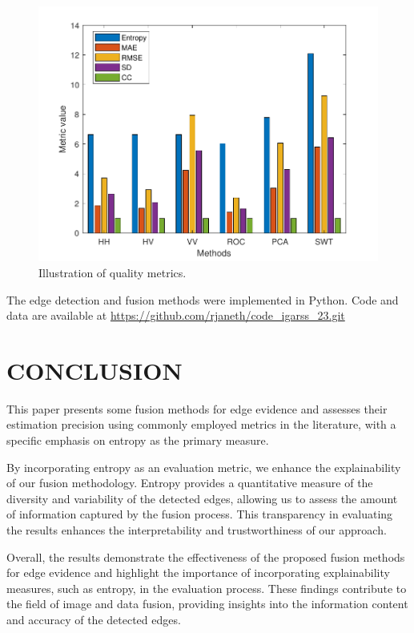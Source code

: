 \documentclass{article}
\begin{document}
 \vspace{-0.45cm}
\begin{figure}[H] 
\centering
	\includegraphics[scale=0.5]{figures/metricas.pdf}
	\caption{Illustration of quality metrics.}\vspace{-0.3cm}
	\label{F5}
\end{figure}
The edge detection and fusion methods were implemented in Python. 
Code and data are available at \url{ https://github.com/rjaneth/code_igarss_23.git}

\section{CONCLUSION} \label{sec_5}

This paper presents some fusion methods for edge evidence and assesses their estimation precision using commonly employed metrics in the literature, with a specific emphasis on entropy as the primary measure.

By incorporating entropy as an evaluation metric, we enhance the explainability of our fusion methodology. Entropy provides a quantitative measure of the diversity and variability of the detected edges, allowing us to assess the amount of information captured by the fusion process. This transparency in evaluating the results enhances the interpretability and trustworthiness of our approach.

Overall, the results demonstrate the effectiveness of the proposed fusion methods for edge evidence and highlight the importance of incorporating explainability measures, such as entropy, in the evaluation process. These findings contribute to the field of image and data fusion, providing insights into the information content and accuracy of the detected edges.


%
%

%


\end{document}
